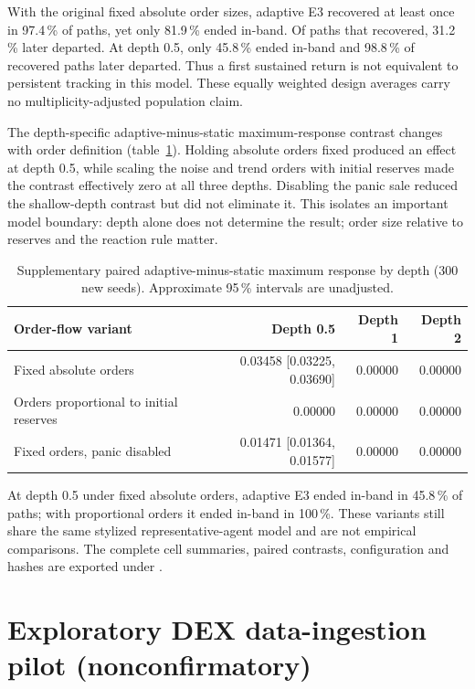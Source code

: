 With the original fixed absolute order sizes, adaptive E3 recovered at least once in 97.4\,\% of paths, yet only 81.9\,\% ended in-band. Of paths that recovered, 31.2\,\% later departed. At depth 0.5, only 45.8\,\% ended in-band and 98.8\,\% of recovered paths later departed. Thus a first sustained return is not equivalent to persistent tracking in this model. These equally weighted design averages carry no multiplicity-adjusted population claim.

The depth-specific adaptive-minus-static maximum-response contrast changes with order definition (table~\ref{tab:engineering-sensitivity}). Holding absolute orders fixed produced an effect at depth 0.5, while scaling the noise and trend orders with initial reserves made the contrast effectively zero at all three depths. Disabling the panic sale reduced the shallow-depth contrast but did not eliminate it. This isolates an important model boundary: depth alone does not determine the result; order size relative to reserves and the reaction rule matter.

\begin{table}[htbp]
\centering
\caption{Supplementary paired adaptive-minus-static maximum response by depth (300 new seeds). Approximate 95\,\% intervals are unadjusted.}
\label{tab:engineering-sensitivity}
\small
\begin{tabular}{@{}lrrr@{}}
\toprule
Order-flow variant & Depth 0.5 & Depth 1 & Depth 2 \\
\midrule
Fixed absolute orders & 0.03458 [0.03225, 0.03690] & 0.00000 & 0.00000 \\
Orders proportional to initial reserves & 0.00000 & 0.00000 & 0.00000 \\
Fixed orders, panic disabled & 0.01471 [0.01364, 0.01577] & 0.00000 & 0.00000 \\
\bottomrule
\end{tabular}
\end{table}

At depth 0.5 under fixed absolute orders, adaptive E3 ended in-band in 45.8\,\% of paths; with proportional orders it ended in-band in 100\,\%. These variants still share the same stylized representative-agent model and are not empirical comparisons. The complete cell summaries, paired contrasts, configuration and hashes are exported under .

\section{Exploratory DEX data-ingestion pilot (nonconfirmatory)}
\label{sec:dex-pilot-results}

